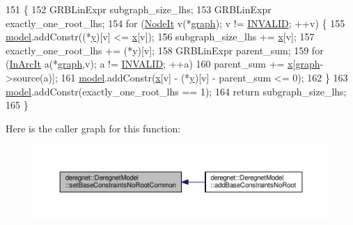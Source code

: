 \begin{DoxyCode}
151                                                                       \{
152     GRBLinExpr subgraph\_size\_lhs;
153     GRBLinExpr exactly\_one\_root\_lhs;
154     \textcolor{keywordflow}{for} (\hyperlink{namespacederegnet_ac34314e1b5f456fc6d1bb9d96316de4a}{NodeIt} v(*\hyperlink{classderegnet_1_1DeregnetModel_a3cd2f54b8e061ef5bed32708d9bc1ef1}{graph}); v != \hyperlink{usinglemon_8h_adf770fe2eec438e3758ffe905dbae208}{INVALID}; ++v) \{
155         \hyperlink{classderegnet_1_1DeregnetModel_a30d525de2086e342b33fe3e45ede4947}{model}.addConstr((*\hyperlink{classderegnet_1_1DeregnetModel_ae76df61afe302b939165facf3dd21ac8}{y})[v] <= \hyperlink{classderegnet_1_1DeregnetModel_a360c980f3fec4dfbab50e9bb06a933a8}{x}[v]);
156         subgraph\_size\_lhs += \hyperlink{classderegnet_1_1DeregnetModel_a360c980f3fec4dfbab50e9bb06a933a8}{x}[v];
157         exactly\_one\_root\_lhs += (*y)[v];
158         GRBLinExpr parent\_sum;
159         \textcolor{keywordflow}{for} (\hyperlink{namespacederegnet_aed58be361aeda4ef7a9eaca2731ba830}{InArcIt} a(*\hyperlink{classderegnet_1_1DeregnetModel_a3cd2f54b8e061ef5bed32708d9bc1ef1}{graph},v); a != \hyperlink{usinglemon_8h_adf770fe2eec438e3758ffe905dbae208}{INVALID}; ++a)
160             parent\_sum += \hyperlink{classderegnet_1_1DeregnetModel_a360c980f3fec4dfbab50e9bb06a933a8}{x}[\hyperlink{classderegnet_1_1DeregnetModel_a3cd2f54b8e061ef5bed32708d9bc1ef1}{graph}->source(a)];
161         \hyperlink{classderegnet_1_1DeregnetModel_a30d525de2086e342b33fe3e45ede4947}{model}.addConstr(\hyperlink{classderegnet_1_1DeregnetModel_a360c980f3fec4dfbab50e9bb06a933a8}{x}[v] - (*\hyperlink{classderegnet_1_1DeregnetModel_ae76df61afe302b939165facf3dd21ac8}{y})[v] - parent\_sum <= 0);
162     \}
163     \hyperlink{classderegnet_1_1DeregnetModel_a30d525de2086e342b33fe3e45ede4947}{model}.addConstr(exactly\_one\_root\_lhs == 1);
164     \textcolor{keywordflow}{return} subgraph\_size\_lhs;
165 \}
\end{DoxyCode}


Here is the caller graph for this function\+:\nopagebreak
\begin{figure}[H]
\begin{center}
\leavevmode
\includegraphics[width=350pt]{classderegnet_1_1DeregnetModel_a5f6cc627b7a800f3d9d77f5f859d241c_icgraph}
\end{center}
\end{figure}


